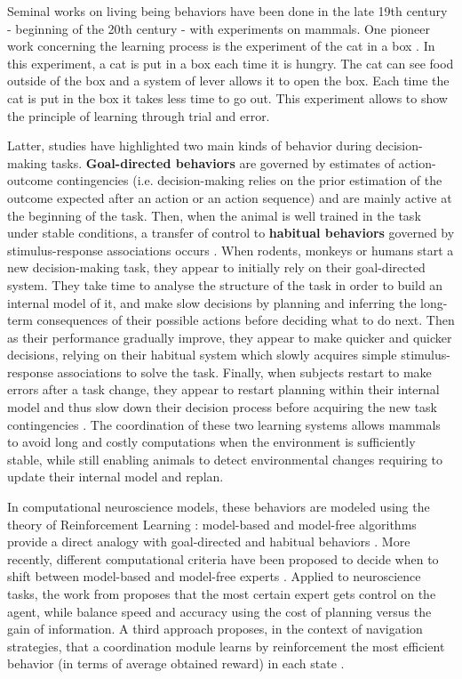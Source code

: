 \documentclass[english,a4paper,11pt,twoside]{StyleThese}
\begin{document}
Seminal works on living being behaviors have been done in the late 19th century - beginning of the 20th century - with experiments on mammals. One pioneer work concerning the learning process is the experiment of the cat in a box \cite{thorndike1998animal}. In this experiment, a cat is put in a box each time it is hungry. The cat can see food outside of the box and a system of lever allows it to open the box. Each time the cat is put in the box it takes less time to go out. This experiment allows to show the principle of learning through trial and error. 

Latter, studies have highlighted two main kinds of behavior during decision-making tasks. \textbf{Goal-directed behaviors} are governed by estimates of action-outcome contingencies (i.e. decision-making relies on the prior estimation of the outcome expected after an action or an action sequence) and are mainly active at the beginning of the task. Then, when the animal is well trained in the task under stable conditions, a transfer of control to \textbf{habitual behaviors} governed by stimulus-response associations occurs  \cite{dickinson1985actions}. When rodents, monkeys or humans start a new decision-making task, they appear to initially rely on their goal-directed system. They take time to analyse the structure of the task in order to build an internal model of it, and make slow decisions by planning and inferring the long-term consequences of their possible actions before deciding what to do next. Then as their performance gradually improve, they appear to make quicker and quicker decisions, relying on their habitual system which slowly acquires simple stimulus-response associations to solve the task. Finally, when subjects restart to make errors after a task change, they appear to restart planning within their internal model and thus slow down their decision process before acquiring the new task contingencies \cite{balleine2010human, dolan2013goals}. The coordination of these two learning systems allows mammals to avoid long and costly computations when the environment is sufficiently stable, while still enabling animals to detect environmental changes requiring to update their internal model and replan.

In computational neuroscience models, these behaviors are modeled using the theory of Reinforcement Learning \cite{sutton1998introduction}: model-based and model-free algorithms provide a direct analogy with goal-directed and habitual behaviors \cite{daw2005uncertainty}. More recently, different computational criteria have been proposed to decide when to shift between model-based and model-free experts \cite{pezzulo2013mixed, lesaint2014modelling, viejo2015modeling}. Applied to neuroscience tasks, the work from \cite{daw2005uncertainty} proposes that the most certain expert gets control on the agent, while \cite{keramati2011speed} balance speed and accuracy using the cost of planning versus the gain of information. A third approach proposes, in the context of navigation strategies, that a coordination module learns by reinforcement the most efficient behavior (in terms of average obtained reward) in each state \cite{dolle2010path}.
\end{document}
